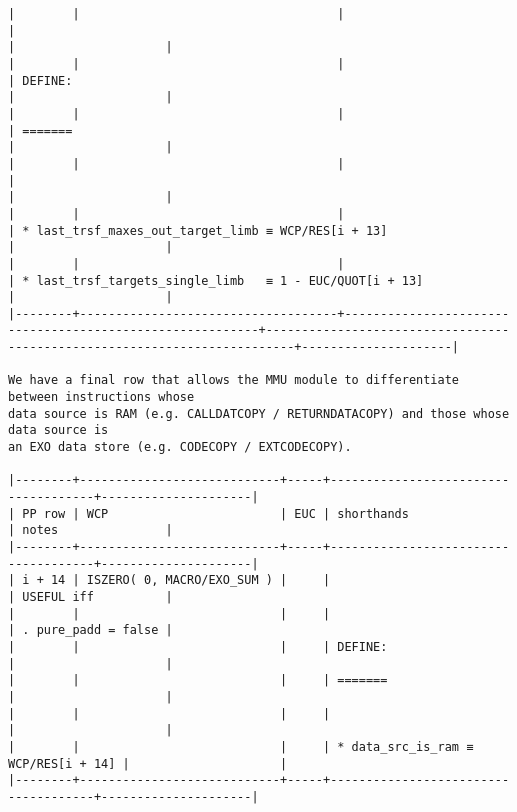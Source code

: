 \documentclass[varwidth=\maxdimen,margin=0.5cm,multi={verbatim}]{standalone}
\begin{document}
\begin{verbatim}
|        |                                    |                                                          |                                                                          |                     |
|        |                                    |                                                          | DEFINE:                                                                  |                     |
|        |                                    |                                                          | =======                                                                  |                     |
|        |                                    |                                                          |                                                                          |                     |
|        |                                    |                                                          | * last_trsf_maxes_out_target_limb ≡ WCP/RES[i + 13]                      |                     |
|        |                                    |                                                          | * last_trsf_targets_single_limb   ≡ 1 - EUC/QUOT[i + 13]                 |                     |
|--------+------------------------------------+----------------------------------------------------------+--------------------------------------------------------------------------+---------------------|

We have a final row that allows the MMU module to differentiate between instructions whose
data source is RAM (e.g. CALLDATCOPY / RETURNDATACOPY) and those whose data source is
an EXO data store (e.g. CODECOPY / EXTCODECOPY).

|--------+----------------------------+-----+-------------------------------------+---------------------|
| PP row | WCP                        | EUC | shorthands                          | notes               |
|--------+----------------------------+-----+-------------------------------------+---------------------|
| i + 14 | ISZERO( 0, MACRO/EXO_SUM ) |     |                                     | USEFUL iff          |
|        |                            |     |                                     | . pure_padd = false |
|        |                            |     | DEFINE:                             |                     |
|        |                            |     | =======                             |                     |
|        |                            |     |                                     |                     |
|        |                            |     | * data_src_is_ram ≡ WCP/RES[i + 14] |                     |
|--------+----------------------------+-----+-------------------------------------+---------------------|
\end{verbatim}
\end{document}
